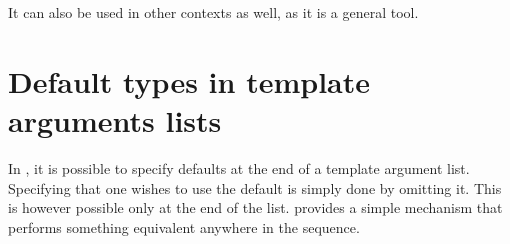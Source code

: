 It can also be used in other contexts as well, as it is a general tool.

\section{Default types in template arguments lists}

In \CC, it is possible to specify defaults at the end of a template argument
list.  Specifying that one wishes to use the default is simply done by omitting
it.  This is however possible only at the end of the list.  
provides a simple mechanism that performs something equivalent anywhere in the
sequence.
